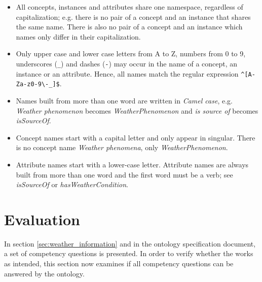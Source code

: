 \begin{itemize}
  \item All concepts, instances and attributes share one namespace, regardless of capitalization; e.g. there is no pair of a concept and an instance that shares the same name. There is also no pair of a concept and an instance which names only differ in their capitalization.
  \item Only upper case and lower case letters from A to Z, numbers from 0 to 9, underscores (\texttt{\_}) and dashes (\texttt{-}) may occur in the name of a concept, an instance or an attribute. Hence, all names match the regular expression \texttt{\^{}[A-Za-z0-9\textbackslash -\_]\$}.
  \item Names built from more than one word are written in \emph{Camel case}, e.g. \emph{Weather phenomenon} becomes \emph{WeatherPhenomenon} and \emph{is source of} becomes \emph{isSourceOf}. %
  \item Concept names start with a capital letter and only appear in singular. There is no concept name \emph{Weather phenomena}, only \emph{WeatherPhenomenon}.
  \item Attribute names start with a lower-case letter. Attribute names are always built from more than one word and the first word must be a verb; see \emph{isSourceOf} or \emph{hasWeatherCondition}.
\end{itemize}


\section{Evaluation}
\label{sec:ontology_evaluation}

In section \ref{sec:weather_information} and in the ontology specification document, a set of competency questions is presented. In order to verify whether the \thinkhomeweather works as intended, this section now examines if all competency questions can be answered by the ontology.

